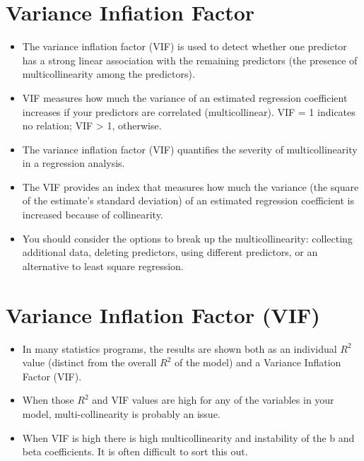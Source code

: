 \documentclass[a4paper,12pt]{article}
\begin{document}
\section*{Variance Infiation Factor}
\begin{itemize}
\item  The variance inflation factor (VIF) is used to detect whether one predictor has a strong linear association
with the remaining predictors (the presence of multicollinearity among the predictors).
\item  VIF measures how much the variance of an estimated regression coefficient increases if your predictors
are correlated (multicollinear). VIF = 1 indicates no relation; VIF > 1, otherwise.

\item  The variance inflation factor (VIF) quantifies the severity of multicollinearity in a regression analysis.
\item  The VIF provides an index that measures how much the variance (the square of the estimate's standard
deviation) of an estimated regression coefficient is increased because of collinearity.

\item  You should consider the options to break up the multicollinearity: collecting additional data, deleting predictors, using different predictors, or 
an alternative to least square regression.
\end{itemize}


\section*{Variance Inflation Factor (VIF)}
\begin{itemize}

\item In many statistics programs, the results are shown both
as an individual $R^2$ value (distinct from the overall $R^2$ of the model) and a Variance Inflation
Factor (VIF). 
\item When those $R^2$ and VIF values are high for any of the variables in your model,
multi-collinearity is probably an issue.
\item When VIF is high there is high multicollinearity and instability of the b and beta coefficients. It is often difficult to sort this out. \\


\end{itemize}
\end{document}
